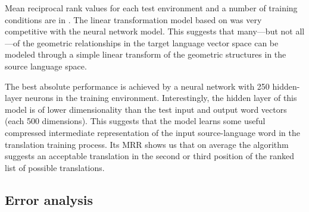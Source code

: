 \documentclass[11pt]{article}
\begin{document}
\begin{table}[tb]
%
\end{table}

Mean reciprocal rank values for each test environment and a number of training
conditions are in . The linear transformation model based on  was very competitive with the neural network model. This suggests that many---but not all---of the geometric relationships in the target language vector space can be modeled through a simple linear transform of the geometric structures in the source language space.

The best absolute performance is achieved by a neural network with 250 hidden-layer
neurons in the  training environment. Interestingly, the hidden layer of this model is of
lower dimensionality than the test input and output word vectors (each 500 dimensions).
This suggests that the model learns some useful compressed intermediate representation of
the input source-language word in the translation training process.
Its MRR shows us that on average the algorithm suggests an acceptable translation in the second or third position of the ranked list of possible translations.

\subsection{Error analysis}
\label{subsec:error-analysis}
\end{document}
